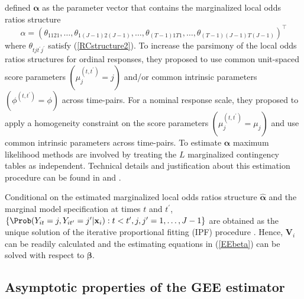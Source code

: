 \documentclass[
]{jss}
\begin{document}
\citet{Touloumis2012} defined \(\boldsymbol \alpha\) as the parameter
vector that contains the marginalized local odds ratios structure
\[\alpha=\left(\theta_{1121},\ldots,\theta_{1(J-1)2(J-1)},\ldots,\theta_{(T-1)1T1},\ldots,\theta_{(T-1)(J-1)T(J-1)}\right)^{\top}\]
where \(\theta_{tjt^{\prime}j^{\prime}}\) satisfy (\ref{RCstructure2}).
To increase the parsimony of the local odds ratios structures for
ordinal responses, they proposed to use common unit-spaced score
parameters \(\left(\mu^{(t,t^{\prime})}_{j}=j\right)\) and/or common
intrinsic parameters \(\left(\phi^{(t,t^{\prime})}=\phi\right)\) across
time-pairs. For a nominal response scale, they proposed to apply a
homogeneity constraint on the score parameters
\(\left(\mu^{(t,t^{\prime})}_{j}=\mu_{j}\right)\) and use common
intrinsic parameters across time-pairs. To estimate
\(\boldsymbol \alpha\) maximum likelihood methods are involved by
treating the \(L\) marginalized contingency tables as independent.
Technical details and justification about this estimation procedure can
be found in \citet{Touloumis2011a} and \citet{Touloumis2012}.

Conditional on the estimated marginalized local odds ratios structure
\(\widehat{\boldsymbol \alpha}\) and the marginal model specification at
times \(t\) and \(t^{\prime}\),
\(\{\Prob(Y_{it}=j,Y_{it^{\prime}}=j^{\prime}|\mathbf x_i):t<t^{\prime},j,j^{\prime}=1,\ldots,J-1\}\)
are obtained as the unique solution of the iterative proportional
fitting (IPF) procedure \citep{Deming1940}. Hence, \(\mathbf V_i\) can
be readily calculated and the estimating equations in (\ref{EEbeta}) can
be solved with respect to \(\boldsymbol \beta\).

\hypertarget{asymptotic-properties-of-the-gee-estimator}{%
\subsection{Asymptotic properties of the GEE
estimator}\label{asymptotic-properties-of-the-gee-estimator}}
\end{document}
